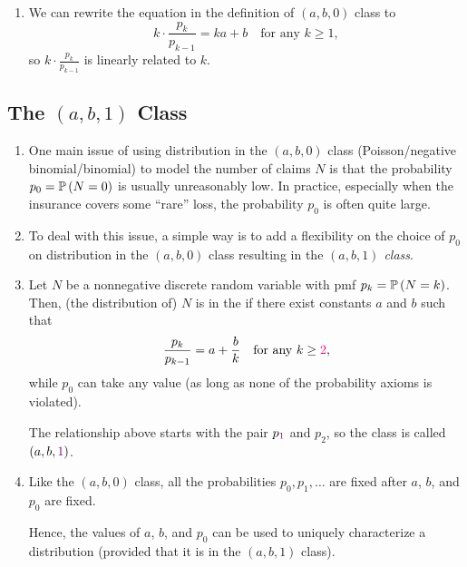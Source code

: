 \begin{enumerate}
\item We can rewrite the equation in the definition of \((a,b,0)\) class to
\[
k\cdot\frac{p_k}{p_{k-1}}=ka+b\quad\text{for any \(k\ge 1\)},
\]
so \(\displaystyle k\cdot \frac{p_k}{p_{k-1}}\) is linearly related to \(k\).

\end{enumerate}
\subsection{The \((a,b,1)\) Class}
\begin{enumerate}
\item One main issue of using distribution in the \((a,b,0)\) class
(Poisson/negative binomial/binomial) to model the number of claims \(N\) is
that the probability \(p_0=\mathbb{P}\left(N=0\right)\) is usually unreasonably low. In practice,
especially when the insurance covers some ``rare'' loss, the probability
\(p_0\) is often quite large.

\item To deal with this issue, a simple way is to add a flexibility on the
choice of \(p_0\) on distribution in the \((a,b,0)\) class 
resulting in the \emph{\((a,b,1)\) class}.

\item Let \(N\) be a nonnegative discrete random variable with pmf
\(p_k=\mathbb{P}\left(N=k\right)\). Then, (the distribution of) \(N\) is in the  if there exist constants \(a\) and \(b\) such that
\[
\frac{p_k}{p_{k-1}}=a+\frac{b}{k}\quad\text{for any \(k\ge {\color{magenta}2}\)},
\]
while \(p_0\) can take any value (as long as none of the probability axioms is
violated).

\begin{note}
The relationship above starts with the pair \(p_{\color{violet} 1}\) and
\(p_2\), so the class is called \((a,b,{\color{violet}1})\).
\end{note}

\item Like the \((a,b,0)\) class, all the probabilities \(p_0,p_1,\dotsc\) are
fixed after \(a\), \(b\), and \(p_0\) are fixed.

Hence, the values of \(a\), \(b\), and \(p_0\) can be used to uniquely
characterize a distribution (provided that it is in the \((a,b,1)\) class).
\end{enumerate}

